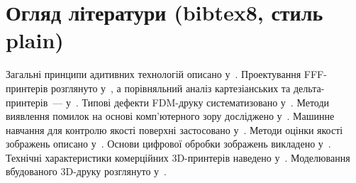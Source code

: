 \documentclass[14pt]{extarticle}
\begin{document}
\section*{Огляд літератури (bibtex8, стиль plain)}

Загальні принципи адитивних технологій описано у~\cite{Gibson2021}.
Проектування FFF-принтерів розглянуто у~\cite{Soni2021},
а порівняльний аналіз картезіанських та дельта-принтерів~--- у~\cite{Schmitt2018}.
Типові дефекти FDM-друку систематизовано у~\cite{Baechle2022}.
Методи виявлення помилок на основі комп'ютерного зору досліджено
у~\cite{Baumann2016, Langeland2020, Paulsen2019}.
Машинне навчання для контролю якості поверхні застосовано у~\cite{Kadam2021}.
Методи оцінки якості зображень описано у~\cite{Crete2007, Wang2005}.
Основи цифрової обробки зображень викладено у~\cite{Gonzalez2018}.
Технічні характеристики комерційних 3D-принтерів наведено у~\cite{BambuLabA1Mini}.
Моделювання вбудованого 3D-друку розглянуто у~\cite{VanDriel2025}.

\nocite{*}



\end{document}
